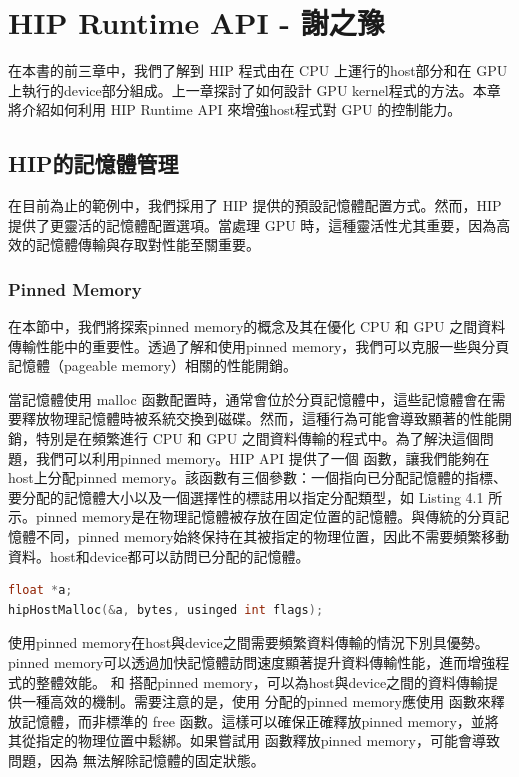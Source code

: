 \chapter{HIP Runtime API - 謝之豫} \label{chap:HIP_runtime_API}

在本書的前三章中，我們了解到 HIP 程式由在 CPU 上運行的host部分和在 GPU 上執行的device部分組成。上一章探討了如何設計 GPU kernel程式的方法。本章將介紹如何利用 HIP Runtime API 來增強host程式對 GPU 的控制能力。

\section{HIP的記憶體管理}
在目前為止的範例中，我們採用了 HIP 提供的預設記憶體配置方式。然而，HIP 提供了更靈活的記憶體配置選項。當處理 GPU 時，這種靈活性尤其重要，因為高效的記憶體傳輸與存取對性能至關重要。

\subsection{Pinned Memory}
在本節中，我們將探索pinned memory的概念及其在優化 CPU 和 GPU 之間資料傳輸性能中的重要性。透過了解和使用pinned memory，我們可以克服一些與分頁記憶體（pageable memory）相關的性能開銷。

當記憶體使用 malloc 函數配置時，通常會位於分頁記憶體中，這些記憶體會在需要釋放物理記憶體時被系統交換到磁碟。然而，這種行為可能會導致顯著的性能開銷，特別是在頻繁進行 CPU 和 GPU 之間資料傳輸的程式中。為了解決這個問題，我們可以利用pinned memory。HIP API 提供了一個  函數，讓我們能夠在host上分配pinned memory。該函數有三個參數：一個指向已分配記憶體的指標、要分配的記憶體大小以及一個選擇性的標誌用以指定分配類型，如 Listing 4.1 所示。pinned memory是在物理記憶體被存放在固定位置的記憶體。與傳統的分頁記憶體不同，pinned memory始終保持在其被指定的物理位置，因此不需要頻繁移動資料。host和device都可以訪問已分配的記憶體。

\begin{lstlisting}[language=C, caption={在HIP中使用pinned memory進行記憶體配置}, label={1st:example}]
float *a;
hipHostMalloc(&a, bytes, usinged int flags);
\end{lstlisting}

使用pinned memory在host與device之間需要頻繁資料傳輸的情況下別具優勢。pinned memory可以透過加快記憶體訪問速度顯著提升資料傳輸性能，進而增強程式的整體效能。 和  搭配pinned memory，可以為host與device之間的資料傳輸提供一種高效的機制。需要注意的是，使用  分配的pinned memory應使用  函數來釋放記憶體，而非標準的 free 函數。這樣可以確保正確釋放pinned memory，並將其從指定的物理位置中鬆綁。如果嘗試用  函數釋放pinned memory，可能會導致問題，因為  無法解除記憶體的固定狀態。

